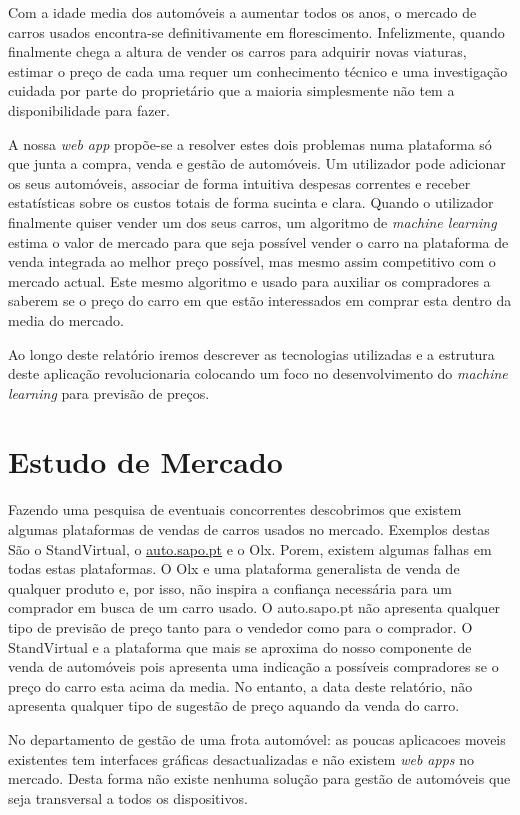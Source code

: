 \documentclass[a4paper]{report}
\begin{document}
Com a idade media dos automóveis a aumentar todos os anos, o mercado de
carros usados encontra-se definitivamente em florescimento. Infelizmente,
quando finalmente chega a altura de vender os carros para adquirir novas
viaturas, estimar o preço de cada uma requer um conhecimento técnico
e uma investigação cuidada por parte do proprietário que a maioria
simplesmente não tem a disponibilidade para fazer.

A nossa \textit{web app} propõe-se a resolver estes dois problemas numa
plataforma só que junta a compra, venda e gestão de automóveis. Um utilizador
pode adicionar os seus automóveis, associar de forma intuitiva despesas correntes
e receber estatísticas sobre os custos totais de forma sucinta e clara. Quando
o utilizador finalmente quiser vender um dos seus carros, um algoritmo de \textit{machine
learning} estima o valor de mercado para que seja possível vender o carro  na
plataforma de venda integrada ao melhor preço possível, mas mesmo assim competitivo
com o mercado actual. Este mesmo algoritmo e usado para auxiliar os compradores
a saberem se o preço do carro em que estão interessados em comprar esta dentro
da media do mercado.

Ao longo deste relatório iremos descrever as tecnologias utilizadas e a estrutura deste
aplicação revolucionaria colocando um foco no desenvolvimento do \textit{machine learning}
para previsão de preços.

\chapter{Estudo de Mercado}

Fazendo uma pesquisa de eventuais concorrentes descobrimos que existem algumas
plataformas de vendas de carros usados no mercado. Exemplos destas São o StandVirtual,
o \url{auto.sapo.pt} e o Olx. Porem, existem algumas falhas em todas estas plataformas.
O Olx e uma plataforma generalista de venda de qualquer produto e, por isso, não inspira
a confiança necessária para um comprador em busca de um carro usado.
O auto.sapo.pt não apresenta qualquer tipo de previsão de preço tanto para
o vendedor como para o comprador. O StandVirtual e a plataforma que mais se aproxima do
nosso componente de venda de automóveis pois apresenta uma indicação a possíveis compradores
se o preço do carro esta acima da media. No entanto, a data deste relatório, não apresenta
qualquer tipo de sugestão de preço aquando da venda do carro.

No departamento de gestão de uma frota automóvel: as poucas aplicacoes moveis existentes tem
interfaces gráficas desactualizadas e não existem \textit{web apps} no mercado. Desta forma
não existe nenhuma solução para gestão de automóveis que seja transversal a todos os dispositivos.
\end{document}

